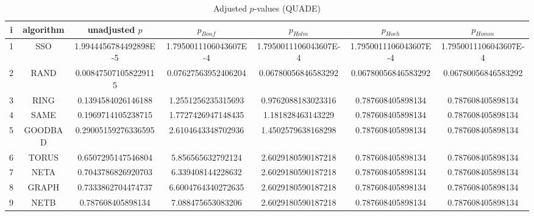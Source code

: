 \documentclass[a4paper,10pt]{article}
\begin{document}
\begin{landscape}
\begin{table}[!htp]
\centering\scriptsize
\caption{Adjusted $p$-values (QUADE)}
\begin{tabular}{ccccccc}
i&algorithm&unadjusted $p$&$p_{Bonf}$&$p_{Holm}$&$p_{Hoch}$&$p_{Homm}$\\
\hline
1& SSO&1.9944456784492898E-5&1.7950011106043607E-4&1.7950011106043607E-4&1.7950011106043607E-4&1.7950011106043607E-4\\
2& RAND&0.008475071058229115&0.07627563952406204&0.06780056846583292&0.06780056846583292&0.06780056846583292\\
3& RING&0.1394584026146188&1.2551256235315693&0.9762088183023316&0.787608405898134&0.787608405898134\\
4& SAME&0.1969714105238715&1.7727426947148435&1.181828463143229&0.787608405898134&0.787608405898134\\
5& GOODBAD&0.29005159276336595&2.6104643348702936&1.4502579638168298&0.787608405898134&0.787608405898134\\
6& TORUS&0.6507295147546804&5.856565632792124&2.6029180590187218&0.787608405898134&0.787608405898134\\
7& NETA&0.7043786826920703&6.339408144228632&2.6029180590187218&0.787608405898134&0.787608405898134\\
8& GRAPH&0.7333862704474737&6.6004764340272635&2.6029180590187218&0.787608405898134&0.787608405898134\\
9& NETB&0.787608405898134&7.088475653083206&2.6029180590187218&0.787608405898134&0.787608405898134\\
\hline
\end{tabular}
\end{table}


\end{landscape}
\end{document}

